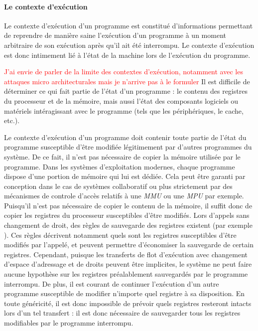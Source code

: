 \paragraph{Le contexte d'exécution}

Le contexte d'exécution d'un programme est constitué d'informations permettant de reprendre de manière saine l'exécution d'un programme à un moment arbitraire de son exécution après qu'il ait été interrompu. Le contexte d'exécution est donc intimement lié à l'état de la machine lors de l'exécution du programme. 

\textcolor{red}{J'ai envie de parler de la limite des contextes d'exécution, notamment avec les attaques micro architecturales mais je n'arrive pas à le formuler} Il est difficile de déterminer ce qui fait partie de l'état d'un programme : le contenu des registres du processeur et de la mémoire, mais aussi l'état des composants logiciels ou matériels intéragissant avec le programme (tels que les périphériques, le cache, etc.).

Le contexte d'exécution d'un programme doit contenir toute partie de l'état du programme susceptible d'être modifiée légitimement par d'autres programmes du système. De ce fait, il n'est pas nécessaire de copier la mémoire utilisée par le programme. Dans les systèmes d'exploitation modernes, chaque programme dispose d'une portion de mémoire qui lui est dédiée. Cela peut être garanti par conception dans le cas de systèmes collaboratif ou plus strictement par des mécanismes de controle d'accès relatifs à une \emph{MMU} ou une \emph{MPU} par exemple. 
Puisqu'il n'est pas nécessaire de copier le contenu de la mémoire, il suffit donc de copier les registres du processeur susceptibles d'être modifiés. Lors d'appels sans changement de droit, des règles de sauvegarde des registres existent (par exemple \cite{arm32_bit_callconv}). Ces règles décrivent notamment quels sont les registres susceptibles d'être modifiés par l'appelé, et peuvent permettre d'économiser la sauvegarde de certain registres.
Cependant, puisque les transferts de flot d'exécution avec changement d'espace d'adressage et de droits peuvent être implicites, le système ne peut faire aucune hypothèse sur les registres préalablement sauvegardés par le programme interrompu. De plus, il est courant de continuer l'exécution d'un autre programme susceptible de modifier n'importe quel registre à sa disposition. En toute généricité, il est donc impossible de prévoir quels registres resteront intacts lors d'un tel transfert : il est donc nécessaire de sauvegarder tous les registres modifiables par le programme interrompu.


